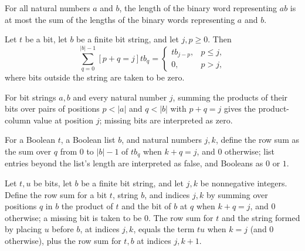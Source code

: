 \begin{lemma}
\label{Complexity.mult_product_length}
\leanok
{}
For all natural numbers $a$ and $b$, the length of the binary word representing $ab$ is
at most the sum of the lengths of the binary words representing $a$ and $b$.
\end{lemma}

\begin{lemma}
\label{Complexity.mult_column_row}
\leanok
{}
Let $t$ be a bit, let $b$ be a finite bit string, and let $j,p\ge 0$. Then
\[\sum_{q=0}^{|b|-1}[p+q=j]t b_q=\begin{cases}t b_{j-p},&p\le j,\\0,&p>j,\end{cases}\]
where bits outside the string are taken to be zero.
\end{lemma}

\begin{lemma}
\label{Complexity.mult_column_double}
\leanok
{}
For bit strings $a,b$ and every natural number $j$, summing the products of their bits
over pairs of positions $p<|a|$ and $q<|b|$ with $p+q=j$ gives the product-column value
at position $j$; missing bits are interpreted as zero.
\end{lemma}

\begin{definition}
\label{Complexity.multRow}
\leanok
For a Boolean $t$, a Boolean list $b$, and natural numbers $j,k$, define the row sum as
the sum over $q$ from $0$ to $|b|-1$ of $t b_q$ when $k+q=j$, and $0$ otherwise; list
entries beyond the list's length are interpreted as false, and Booleans as $0$ or $1$.
\end{definition}

\begin{lemma}
\label{Complexity.multRow_cons}
\leanok
{}
Let $t,u$ be bits, let $b$ be a finite bit string, and let $j,k$ be nonnegative
integers. Define the row sum for a bit $t$, string $b$, and indices $j,k$ by summing
over positions $q$ in $b$ the product of $t$ and the bit of $b$ at $q$ when $k+q=j$, and
$0$ otherwise; a missing bit is taken to be $0$. The row sum for $t$ and the string
formed by placing $u$ before $b$, at indices $j,k$, equals the term $t u$ when $k=j$
(and $0$ otherwise), plus the row sum for $t,b$ at indices $j,k+1$.
\end{lemma}

